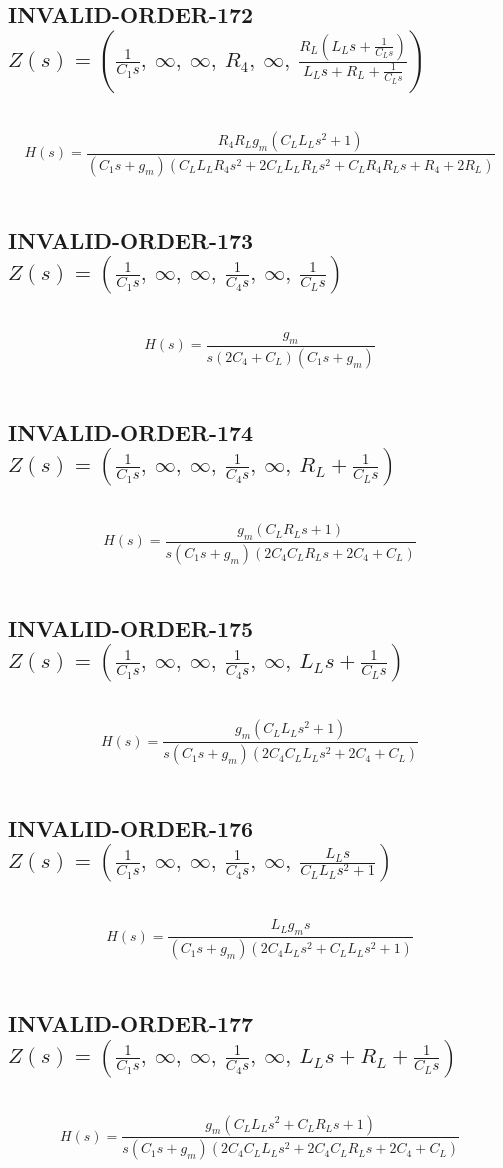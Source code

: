 \documentclass{article}
\begin{document}
\subsection{INVALID-ORDER-172 $Z(s) = \left( \frac{1}{C_{1} s}, \  \infty, \  \infty, \  R_{4}, \  \infty, \  \frac{R_{L} \left(L_{L} s + \frac{1}{C_{L} s}\right)}{L_{L} s + R_{L} + \frac{1}{C_{L} s}}\right)$ } \ 
\textbf{\[H(s) = \frac{R_{4} R_{L} g_{m} \left(C_{L} L_{L} s^{2} + 1\right)}{\left(C_{1} s + g_{m}\right) \left(C_{L} L_{L} R_{4} s^{2} + 2 C_{L} L_{L} R_{L} s^{2} + C_{L} R_{4} R_{L} s + R_{4} + 2 R_{L}\right)}\] } \ 
\subsection{INVALID-ORDER-173 $Z(s) = \left( \frac{1}{C_{1} s}, \  \infty, \  \infty, \  \frac{1}{C_{4} s}, \  \infty, \  \frac{1}{C_{L} s}\right)$ } \ 
\textbf{\[H(s) = \frac{g_{m}}{s \left(2 C_{4} + C_{L}\right) \left(C_{1} s + g_{m}\right)}\] } \ 
\subsection{INVALID-ORDER-174 $Z(s) = \left( \frac{1}{C_{1} s}, \  \infty, \  \infty, \  \frac{1}{C_{4} s}, \  \infty, \  R_{L} + \frac{1}{C_{L} s}\right)$ } \ 
\textbf{\[H(s) = \frac{g_{m} \left(C_{L} R_{L} s + 1\right)}{s \left(C_{1} s + g_{m}\right) \left(2 C_{4} C_{L} R_{L} s + 2 C_{4} + C_{L}\right)}\] } \ 
\subsection{INVALID-ORDER-175 $Z(s) = \left( \frac{1}{C_{1} s}, \  \infty, \  \infty, \  \frac{1}{C_{4} s}, \  \infty, \  L_{L} s + \frac{1}{C_{L} s}\right)$ } \ 
\textbf{\[H(s) = \frac{g_{m} \left(C_{L} L_{L} s^{2} + 1\right)}{s \left(C_{1} s + g_{m}\right) \left(2 C_{4} C_{L} L_{L} s^{2} + 2 C_{4} + C_{L}\right)}\] } \ 
\subsection{INVALID-ORDER-176 $Z(s) = \left( \frac{1}{C_{1} s}, \  \infty, \  \infty, \  \frac{1}{C_{4} s}, \  \infty, \  \frac{L_{L} s}{C_{L} L_{L} s^{2} + 1}\right)$ } \ 
\textbf{\[H(s) = \frac{L_{L} g_{m} s}{\left(C_{1} s + g_{m}\right) \left(2 C_{4} L_{L} s^{2} + C_{L} L_{L} s^{2} + 1\right)}\] } \ 
\subsection{INVALID-ORDER-177 $Z(s) = \left( \frac{1}{C_{1} s}, \  \infty, \  \infty, \  \frac{1}{C_{4} s}, \  \infty, \  L_{L} s + R_{L} + \frac{1}{C_{L} s}\right)$ } \ 
\textbf{\[H(s) = \frac{g_{m} \left(C_{L} L_{L} s^{2} + C_{L} R_{L} s + 1\right)}{s \left(C_{1} s + g_{m}\right) \left(2 C_{4} C_{L} L_{L} s^{2} + 2 C_{4} C_{L} R_{L} s + 2 C_{4} + C_{L}\right)}\] } \ 
\end{document}
